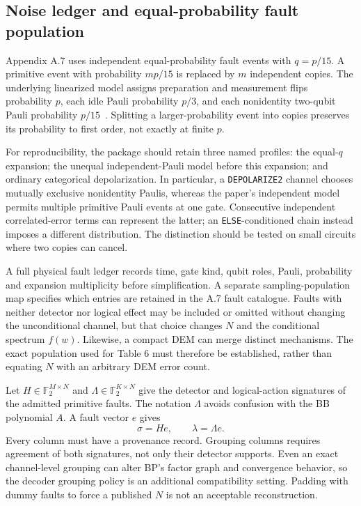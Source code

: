 \documentclass[11pt,a4paper]{article}
\newcommand{\F}{\mathbb{F}_2}
\begin{document}
\subsection{Noise ledger and equal-probability fault population}

Appendix A.7 uses independent equal-probability fault events with $q=p/15$. A primitive event with probability $mp/15$ is replaced by $m$ independent copies. The underlying linearized model assigns preparation and measurement flips probability $p$, each idle Pauli probability $p/3$, and each nonidentity two-qubit Pauli probability $p/15$~\cite{tdg}. Splitting a larger-probability event into copies preserves its probability to first order, not exactly at finite $p$.

For reproducibility, the package should retain three named profiles: the equal-$q$ expansion; the unequal independent-Pauli model before this expansion; and ordinary categorical depolarization. In particular, a \texttt{DEPOLARIZE2} channel chooses mutually exclusive nonidentity Paulis, whereas the paper's independent model permits multiple primitive Pauli events at one gate. Consecutive independent correlated-error terms can represent the latter; an \texttt{ELSE}-conditioned chain instead imposes a different distribution. The distinction should be tested on small circuits where two copies can cancel.

A full physical fault ledger records time, gate kind, qubit roles, Pauli, probability and expansion multiplicity before simplification. A separate sampling-population map specifies which entries are retained in the A.7 fault catalogue. Faults with neither detector nor logical effect may be included or omitted without changing the unconditional channel, but that choice changes $N$ and the conditional spectrum $f(w)$. Likewise, a compact DEM can merge distinct mechanisms. The exact population used for Table 6 must therefore be established, rather than equating $N$ with an arbitrary DEM error count.

Let $H\in\F^{M\times N}$ and $\Lambda\in\F^{K\times N}$ give the detector and logical-action signatures of the admitted primitive faults. The notation $\Lambda$ avoids confusion with the BB polynomial $A$. A fault vector $e$ gives
\begin{equation}
 \sigma=He,\qquad \lambda=\Lambda e.
 \label{eq:faultmap}
\end{equation}
Every column must have a provenance record. Grouping columns requires agreement of both signatures, not only their detector supports. Even an exact channel-level grouping can alter BP's factor graph and convergence behavior, so the decoder grouping policy is an additional compatibility setting. Padding with dummy faults to force a published $N$ is not an acceptable reconstruction.
\end{document}
